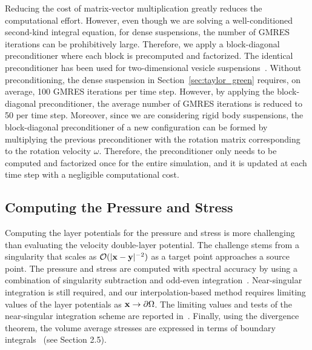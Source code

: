 \documentclass[AMA,STIX1COL]{WileyNJD-v2}
\begin{document}
Reducing the cost of matrix-vector multiplication greatly reduces the
computational effort.  However, even though we are solving a
well-conditioned second-kind integral equation, for dense suspensions,
the number of GMRES iterations can be prohibitively large.  Therefore,
we apply a block-diagonal preconditioner where each block is precomputed
and factorized.  The identical preconditioner has been used for
two-dimensional vesicle suspensions~\cite{Quaife2014}.  Without
preconditioning, the dense suspension in Section~\ref{sec:taylor_green}
requires, on average, 100 GMRES iterations per time step. However, by
applying the block-diagonal preconditioner, the average number of GMRES
iterations is reduced to 50 per time step.  Moreover, since we are
considering rigid body suspensions, the block-diagonal preconditioner of
a new configuration can be formed by multiplying the previous
preconditioner with the rotation matrix corresponding to the rotation
velocity $\omega$.  Therefore, the preconditioner only needs to be
computed and factorized once for the entire simulation, and it is
updated at each time step with a negligible computational cost.


\subsection{Computing the Pressure and Stress}
\label{sec:pressure_stress}
Computing the layer potentials for the pressure and stress is more
challenging than evaluating the velocity double-layer potential.  The
challenge stems from a singularity that scales as $\mathcal{O}(|{\mathbf{x}} -
{\mathbf{y}}|^{-2})$ as a target point approaches a source point.  The pressure
and stress are computed with spectral accuracy by using a combination of
singularity subtraction and odd-even integration~\cite{sid-isr1988}.
Near-singular integration is still required, and our interpolation-based
method requires limiting values of the layer potentials as ${\mathbf{x}}
\rightarrow {\partial}\Omega$.  The limiting values and tests of the
near-singular integration scheme are reported in~\cite{Quaife2014}.
Finally, using the divergence theorem, the volume average stresses are
expressed in terms of boundary integrals~\cite{Pozrikidis1992} (see
Section 2.5).

\end{document}
